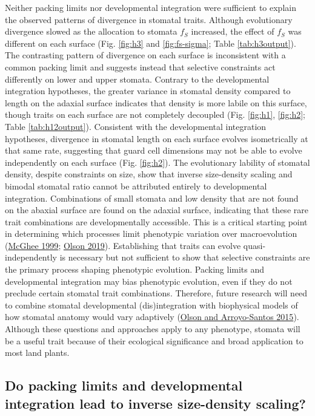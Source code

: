 \documentclass[
  12pt,
]{article}
\begin{document}
Neither packing limits nor developmental integration were sufficient to explain the observed patterns of divergence in stomatal traits. Although evolutionary divergence slowed as the allocation to stomata \(f_S\) increased, the effect of \(f_S\) was different on each surface (Fig. \ref{fig:h3} and \ref{fig:fs-sigma}; Table \ref{tab:h3output}). The contrasting pattern of divergence on each surface is inconsistent with a common packing limit and suggests instead that selective constraints act differently on lower and upper stomata. Contrary to the developmental integration hypotheses, the greater variance in stomatal density compared to length on the adaxial surface indicates that density is more labile on this surface, though traits on each surface are not completely decoupled (Fig. \ref{fig:h1}, \ref{fig:h2}; Table \ref{tab:h12output}). Consistent with the developmental integration hypotheses, divergence in stomatal length on each surface evolves isometrically at that same rate, suggesting that guard cell dimensions may not be able to evolve independently on each surface (Fig. \ref{fig:h2}). The evolutionary lability of stomatal density, despite constraints on size, show that inverse size-density scaling and bimodal stomatal ratio cannot be attributed entirely to developmental integration. Combinations of small stomata and low density that are not found on the abaxial surface are found on the adaxial surface, indicating that these rare trait combinations are developmentally accessible. This is a critical starting point in determining which processes limit phenotypic variation over macroevolution (\protect\hyperlink{ref-mcghee_theoretical_1999}{McGhee 1999}; \protect\hyperlink{ref-olson_plant_2019}{Olson 2019}). Establishing that traits can evolve quasi-independently is necessary but not sufficient to show that selective constraints are the primary process shaping phenotypic evolution. Packing limits and developmental integration may bias phenotypic evolution, even if they do not preclude certain stomatal trait combinations. Therefore, future research will need to combine stomatal developmental (dis)integration with biophysical models of how stomatal anatomy would vary adaptively (\protect\hyperlink{ref-olson_how_2015}{Olson and Arroyo-Santos 2015}). Although these questions and approaches apply to any phenotype, stomata will be a useful trait because of their ecological significance and broad application to most land plants.

\hypertarget{do-packing-limits-and-developmental-integration-lead-to-inverse-size-density-scaling}{%
\subsection{Do packing limits and developmental integration lead to inverse size-density scaling?}\label{do-packing-limits-and-developmental-integration-lead-to-inverse-size-density-scaling}}
\end{document}
